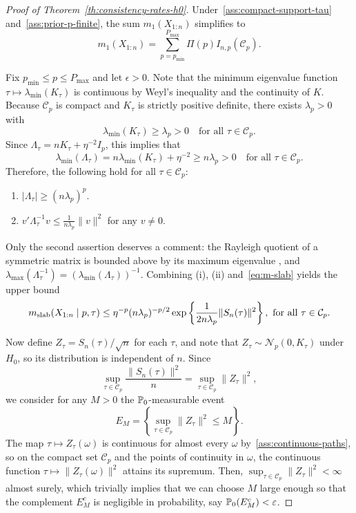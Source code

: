 \begin{proof}[Proof of Theorem~\ref{th:consistency-rates-h0}]\label{proof:consistency-rates-h0}
Under~\ref{ass:compact-support-tau} and~\ref{ass:prior-p-finite}, the sum \(m_1(X_{1:n})\) simplifies to
\[
m_1(X_{1:n}) = \sum_{p=p_{\min}}^{P_{\max}} \Pi(p) I_{n,p}(\mathcal C_p).
\]

Fix \(p_{\min} \leq p\leq P_{\max}\) and let \(\epsilon>0\). Note that the minimum eigenvalue function \(\tau\mapsto\lambda_{\min}(K_\tau)\) is continuous by Weyl's inequality \citep[Theorem~VI.2.1]{bhatia1996matrix} and the continuity of \(K\). Because \(\mathcal C_p\) is compact and \(K_\tau\) is strictly positive definite, there exists \(\lambda_p>0\) with
\[
\lambda_{\min}(K_\tau)\ge \lambda_p>0\quad\text{for all }\tau\in \mathcal C_p.
\]
Since \(\Lambda_\tau = nK_\tau + \eta^{-2}I_p\), this implies that 
\[
  \lambda_{\min}(\Lambda_\tau) = n\lambda_{\min}(K_\tau) + \eta^{-2} \geq n\lambda_p>0\quad \text{for all } \tau \in \mathcal C_p.
\]
Therefore, the following hold for all \(\tau\in \mathcal C_p\):
\begin{enumerate}[label=(\roman*)]
  \item \(|\Lambda_\tau| \geq (n\lambda_p)^p\).
  \item \(v'\Lambda_{\tau}^{-1}v \leq \frac{1}{n\lambda_p}\|v\|^2\) for any \(v\neq 0\).
\end{enumerate}
Only the second assertion deserves a comment: the Rayleigh quotient of a symmetric matrix is bounded above by its maximum eigenvalue \citep[Theorem 4.2.2]{horn1985matrix}, and \(\lambda_{\max}(\Lambda_\tau^{-1})=(\lambda_{\min}(\Lambda_\tau))^{-1}\). Combining (i), (ii) and~\eqref{eq:m-slab} yields the upper bound
\begin{equation}\label{eq:upper-bound-m-slab}
m_{\text{slab}}(X_{1:n}\mid p,\tau) \leq \eta^{-p}(n\lambda_p)^{-p/2} \exp\left\{\frac{1}{2n\lambda_p}\|S_n(\tau)\|^2\right\}, \ \text{for all } \tau \in \mathcal C_p.
\end{equation}

Now define \(Z_\tau = S_n(\tau)/\sqrt{n}\) for each \(\tau\), and note that \(Z_\tau \sim \mathcal N_p(0, K_\tau)\) under \(H_0\), so its distribution is independent of \(n\). Since
\[
\sup_{\tau \in \mathcal C_p} \frac{\|S_n(\tau)\|^2}{n} = \sup_{\tau \in \mathcal C_p} \|Z_\tau\|^2,
\]
we consider for any \(M>0\) the \(\mathbb{P}_0\)-measurable event
\begin{equation}\label{eq:event-E-n-M}
E_{M} = \left\{\sup_{\tau\in \mathcal C_p} \|Z_\tau\|^2\leq M\right\}.
\end{equation}
The map \(\tau \mapsto Z_\tau(\omega)\) is continuous for almost every \(\omega\) by~\ref{ass:continuous-paths}, so on the compact set \(\mathcal C_p\) and the points of continuity in \(\omega\), the continuous function \(\tau \mapsto \|Z_\tau(\omega)\|^2\) attains its supremum. Then, \(\sup_{\tau \in \mathcal C_p} \|Z_\tau\|^2 < \infty\) almost surely, which trivially implies that we can choose \(M\) large enough so that the complement \(E_{M}^c\) is negligible in probability, say \(\mathbb{P}_0(E_{M}^c) < \varepsilon\).


\end{proof}
